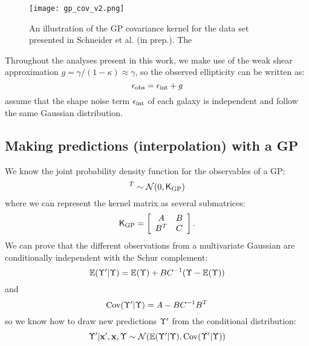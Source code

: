 \begin{figure}
	\centering
	\texttt{[image: gp\_cov\_v2.png]}
	\caption{An illustration of the GP covariance kernel for the data set
		presented in Schneider et al. (in prep.). The  
		\label{fig:GP_kernel_vis}}
\end{figure}




Throughout the analyses present in this work, 
we make use of the weak shear approximation 
$g = \gamma / (1 - \kappa)  \approx \gamma$, so the observed ellipticity can be
written as: 
\begin{equation}
	\epsilon_{\rm obs} = \epsilon_{\rm int} + g 
\end{equation}
assume that the shape noise term $\epsilon_{\rm int}$ of each galaxy is 
independent and follow the same Gaussian distribution.  

\subsection{Making predictions (interpolation) with a GP}
We know the joint probability density function for the observables of a GP:
\begin{equation}
	[\lensparams',\lensparams]^T \sim \mathcal{N}(0, \kerngp_{\rm GP})
\end{equation}
where we can represent the kernel matrix as several submatrices:
\begin{equation}
	\mathsf{K}_{\rm GP} = \left[\begin{array}{cc}
	A & B \\
	B^T & C 
\end{array} \right].	
\end{equation}
We can prove that the different observations from a multivariate Gaussian are 
conditionally independent with the Schur complement:
\begin{equation}
	\mathbb{E}(\Upsilon'|\Upsilon) = \mathbb{E}(\Upsilon) + BC^{-1}(\Upsilon - \mathbb{E}(\Upsilon))
\end{equation}
and
\begin{equation}
	\mathrm{Cov}(\Upsilon'|\Upsilon) = A - BC^{-1}B^T
\end{equation}
so we know how to draw new predictions $\Upsilon'$ from the conditional distribution:
\begin{equation} 
	\Upsilon' | \mathbf{x}', \mathbf{x}, \Upsilon \sim \mathcal{N}(
		\mathbb{E}(\Upsilon'| \Upsilon), \mathrm{Cov}(\Upsilon'|\Upsilon)
	)
\end{equation}


